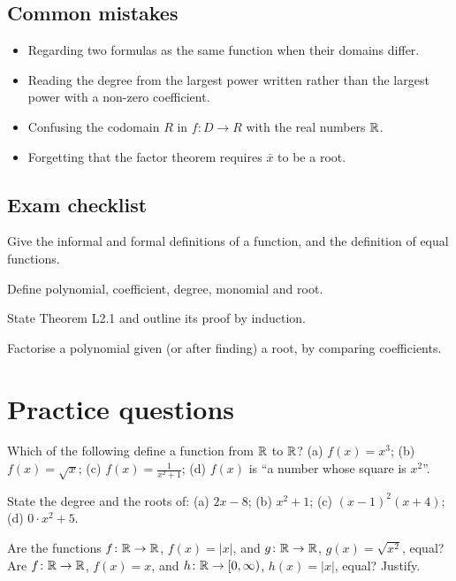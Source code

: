 \subsection*{Common mistakes}
\begin{itemize}
  \item Regarding two formulas as the same function when their domains differ.
  \item Reading the degree from the largest power written rather than the largest power with a non-zero coefficient.
  \item Confusing the codomain $R$ in $f\colon D\to R$ with the real numbers $\mathbb{R}$.
  \item Forgetting that the factor theorem requires $\bar x$ to be a root.
\end{itemize}

\subsection*{Exam checklist}
\begin{checklist}
  \item Give the informal and formal definitions of a function, and the definition of equal functions.
  \item Define polynomial, coefficient, degree, monomial and root.
  \item State Theorem L2.1 and outline its proof by induction.
  \item Factorise a polynomial given (or after finding) a root, by comparing coefficients.
\end{checklist}

\section{Practice questions}
\pq[basic] Which of the following define a function from $\mathbb{R}$ to $\mathbb{R}$? (a) $f(x)=x^3$; (b) $f(x)=\sqrt x$;
(c) $f(x)=\frac1{x^2+1}$; (d) $f(x)$ is ``a number whose square is $x^2$''.

\pq[basic] State the degree and the roots of: (a) $2x-8$; (b) $x^2+1$; (c) $(x-1)^2(x+4)$; (d) $0\cdot x^2+5$.

\pq[conceptual] Are the functions $f\colon\mathbb{R}\to\mathbb{R}$, $f(x)=|x|$, and $g\colon\mathbb{R}\to\mathbb{R}$, $g(x)=\sqrt{x^2}$, equal? Are
$f\colon\mathbb{R}\to\mathbb{R}$, $f(x)=x$, and $h\colon\mathbb{R}\to[0,\infty)$, $h(x)=|x|$, equal? Justify.

